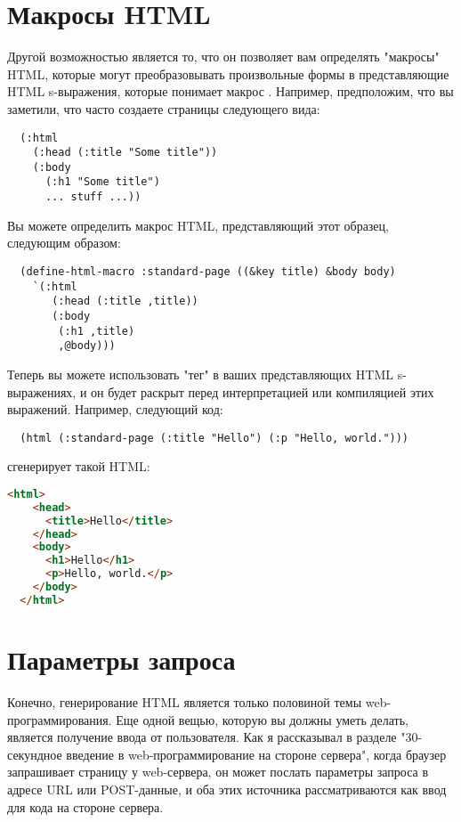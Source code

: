 \section{Макросы HTML}

Другой возможностью  является то, что он позволяет вам определять "макросы"
HTML, которые могут преобразовывать произвольные формы в представляющие HTML s-выражения,
которые понимает макрос . Например, предположим, что вы заметили, что часто
создаете страницы следующего вида:

\begin{lstlisting}
  (:html
    (:head (:title "Some title"))
    (:body
      (:h1 "Some title")
      ... stuff ...))
\end{lstlisting}

Вы можете определить макрос HTML, представляющий этот образец, следующим образом:

\begin{lstlisting}
  (define-html-macro :standard-page ((&key title) &body body)
    `(:html
       (:head (:title ,title))
       (:body
        (:h1 ,title)
        ,@body)))
\end{lstlisting}

Теперь вы можете использовать "тег"  в ваших представляющих HTML
s-выражениях, и он будет раскрыт перед интерпретацией или компиляцией этих
выражений. Например, следующий код:

\begin{lstlisting}
  (html (:standard-page (:title "Hello") (:p "Hello, world.")))
\end{lstlisting}

сгенерирует такой HTML:

\begin{lstlisting}[language=HTML]
  <html>
    <head>
      <title>Hello</title>
    </head>
    <body>
      <h1>Hello</h1>
      <p>Hello, world.</p>
    </body>
  </html>
\end{lstlisting}

\section{Параметры запроса}

Конечно, генерирование HTML является только половиной темы web-программирования. Еще одной
вещью, которую вы должны уметь делать, является получение ввода от пользователя. Как я
рассказывал в разделе "30-секундное введение в web-программирование на стороне сервера",
когда браузер запрашивает страницу у web-сервера, он может послать параметры запроса в
адресе URL или POST-данные, и оба этих источника рассматриваются как ввод для кода на
стороне сервера.

